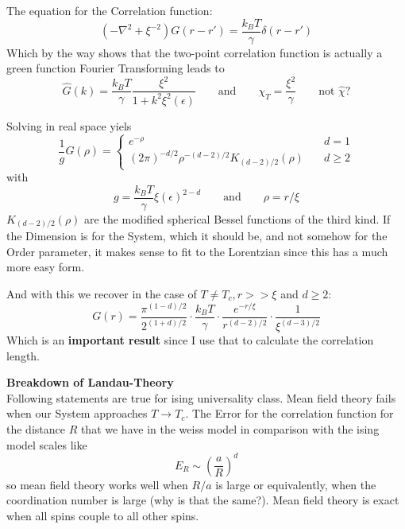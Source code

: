 	The equation for the Correlation function:
	\begin{equation}
		\left(- \nabla^2 + \xi^{-2}\right) G(r -r') =	\frac{k_B T}{\gamma} \delta(r - r')
	\end{equation}
	Which by the way shows that the two-point correlation function is actually a green function
	Fourier Transforming leads to
	\begin{equation}
		\hat{G}(k) 	=\frac{k_B T}{\gamma} \frac{\xi^2}{1 + k^2 \xi^2(\epsilon)} \qquad \text{and} \qquad \chi_T =	\frac{\xi^2}{\gamma} \qquad \text{not $\hat{\chi}$?}
	\end{equation}
	
	Solving in real space yiels
	\begin{equation}
		\frac{1}{g} G(\rho) =	\begin{cases}
			e^{-\rho} \qquad &d=1 \\
			(2\pi)^{-d/2} \rho^{-(d-2) / 2} K_{(d-2)/2}(\rho) \quad &d \geq 2
		\end{cases}
	\end{equation}
	with
	\begin{equation}
		g =	\frac{k_B T}{\gamma} \xi(\epsilon)^{2-d} \qquad \text{and} \qquad \rho =	r/\xi
	\end{equation}
	$K_{(d-2)/2}(\rho)$ are the modified spherical Bessel functions of the third kind.
	If the Dimension is for the System, which it should be, and not somehow for the Order parameter, it makes sense to fit to the Lorentzian since this has a much more easy form.
	
	And with this we recover in the case of $T \neq T_c, r >> \xi$ and $d \geq 2$:
	\begin{equation}
		G(r) =	\frac{\pi^{(1-d)/2}}{2^{(1+d)/2}} \cdot \frac{k_B T}{\gamma} \cdot \frac{e^{-r/\xi}}{r^{(d-2)/2}} \cdot \frac{1}{\xi^{(d-3)/2}}
	\end{equation}
	Which is an \textbf{important result} since I	use that to calculate the correlation length.
	
	\textbf{Breakdown of Landau-Theory} \\
	Following statements are true for ising universality class.
	Mean field theory fails when our System approaches $T \rightarrow T_c$. The Error for the correlation function for the distance $R$ that we have in the weiss model in comparison with the ising model scales like
	\begin{equation}
		E_R \sim \left(\frac{a}{R}\right)^d
	\end{equation}
	so mean field theory works well when $R/a$ is large or equivalently, when the coordination number is large	(why is that the same?). Mean field theory is exact when all spins couple to all other spins.
	
